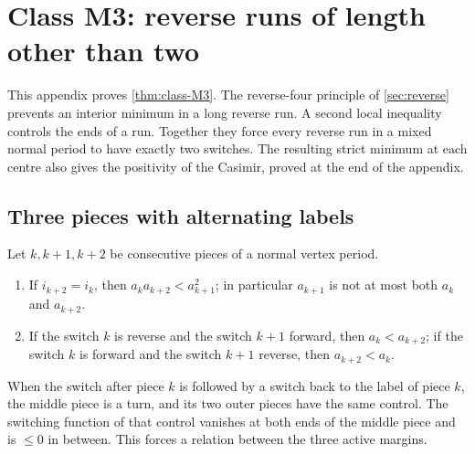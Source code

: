 \section{Class M3: reverse runs of length other than two}\label{sec:mixed-runs}

This appendix proves \cref{thm:class-M3}. The reverse-four principle of \cref{sec:reverse}
prevents an interior minimum in a long reverse run. A second local inequality controls the ends
of a run. Together they force every reverse run in a mixed normal period to have exactly two
switches. The resulting strict minimum at each centre also gives the positivity of the Casimir,
proved at the end of the appendix.

\subsection{Three pieces with alternating labels}\label{sec:rev-three}

\begin{lemma}\label{lem:three-arc}
Let $k,k+1,k+2$ be consecutive pieces of a normal vertex period.
\begin{enumerate}[label=\textup{(\alph*)}]
\item If $i_{k+2}=i_k$, then $a_ka_{k+2}<a_{k+1}^2$; in particular $a_{k+1}$ is not at most both
  $a_k$ and $a_{k+2}$.
\item If the switch $k$ is reverse and the switch $k+1$ forward, then $a_k<a_{k+2}$; if the switch
  $k$ is forward and the switch $k+1$ reverse, then $a_{k+2}<a_k$.
\end{enumerate}
\end{lemma}

When the switch after piece $k$ is followed by a switch back to the label of piece $k$, the
middle piece is a turn, and its two outer pieces have the same control. The switching function
of that control vanishes at both ends of the middle piece and is $\le0$ in between. This forces
a relation between the three active margins.

